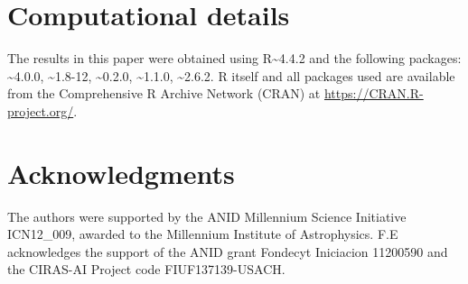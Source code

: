 \section{Computational details}\label{computational-details}

The results in this paper were obtained using R\textasciitilde4.4.2 and the following packages: \textasciitilde4.0.0, \textasciitilde1.8-12, \textasciitilde0.2.0, \textasciitilde1.1.0, \textasciitilde2.6.2. R itself and all packages used are available from the Comprehensive R Archive Network (CRAN) at \url{https://CRAN.R-project.org/}.

\section*{Acknowledgments}\label{acknowledgments}

The authors were supported by the ANID Millennium Science Initiative ICN12\_009, awarded to the Millennium Institute of Astrophysics. F.E acknowledges the support of the ANID grant Fondecyt Iniciacion 11200590 and the CIRAS-AI Project code FIUF137139-USACH.

\renewcommand{\refname}{References}



\address{%
Felipe Elorrieta\\
Universidad de Santiago de Chile\\%
Department of Mathematics and Computer Science\\ Av. Libertador Bernardo O'Higgins 3663, Estación Central, Santiago, Chile\\
%
%
\textit{ORCiD: \href{https://orcid.org/0000-0002-1835-7433}{0000-0002-1835-7433}}\\%
\href{mailto:felipe.elorrieta@usach.cl}{\nolinkurl{felipe.elorrieta@usach.cl}}%
}

\address{%
Susana Eyheramendy\\
Universidad Adolfo Ibañez\\%
Faculty of Engineering and Sciences\\ Diagonal Las Torres 2700, Peñalolén, Santiago, Chile\\
%
%
\textit{ORCiD: \href{https://orcid.org/0000-0003-4723-9660}{0000-0003-4723-9660}}\\%
\href{mailto:susana.eyheramendy@gmail.com}{\nolinkurl{susana.eyheramendy@gmail.com}}%
}

